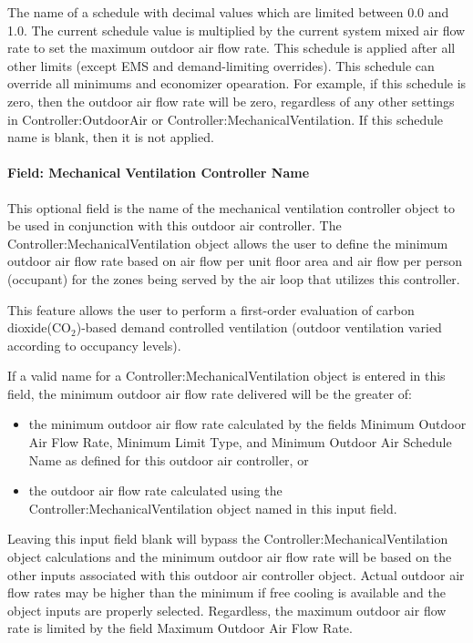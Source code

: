 The name of a schedule with decimal values which are limited between 0.0 and 1.0. The current schedule value is multiplied by the current system mixed air flow rate to set the maximum outdoor air flow rate. This schedule is applied after all other limits (except EMS and demand-limiting overrides).  This schedule can override all minimums and economizer opearation.  For example, if this schedule is zero, then the outdoor air flow rate will be zero, regardless of any other settings in Controller:OutdoorAir or Controller:MechanicalVentilation. If this schedule name is blank, then it is not applied.

\paragraph{Field: Mechanical Ventilation Controller Name}\label{field-mechanical-ventilation-controller-name}

This optional field is the name of the mechanical ventilation controller object to be used in conjunction with this outdoor air controller. The Controller:MechanicalVentilation object allows the user to define the minimum outdoor air flow rate based on air flow per unit floor area and air flow per person (occupant) for the zones being served by the air loop that utilizes this controller.

This feature allows the user to perform a first-order evaluation of carbon dioxide(CO\(_{2}\))-based demand controlled ventilation (outdoor ventilation varied according to occupancy levels).

If a valid name for a Controller:MechanicalVentilation object is entered in this field, the minimum outdoor air flow rate delivered will be the greater of:

\begin{itemize}
\item
  the minimum outdoor air flow rate calculated by the fields Minimum Outdoor Air Flow Rate, Minimum Limit Type, and Minimum Outdoor Air Schedule Name as defined for this outdoor air controller, or
\item
  the outdoor air flow rate calculated using the Controller:MechanicalVentilation object named in this input field.
\end{itemize}

Leaving this input field blank will bypass the Controller:MechanicalVentilation object calculations and the minimum outdoor air flow rate will be based on the other inputs associated with this outdoor air controller object. Actual outdoor air flow rates may be higher than the minimum if free cooling is available and the object inputs are properly selected. Regardless, the maximum outdoor air flow rate is limited by the field Maximum Outdoor Air Flow Rate.

